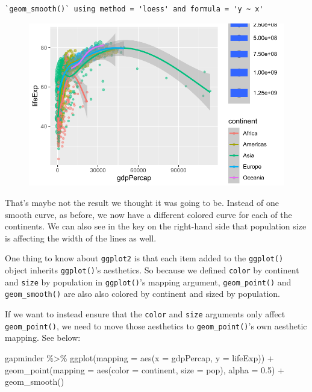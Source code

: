 \documentclass[
  letterpaper,
]{book}
\newenvironment{Shaded}{\begin{snugshade}}{\end{snugshade}}
\newcommand{\AttributeTok}[1]{\textcolor[rgb]{0.40,0.45,0.13}{#1}}
\newcommand{\FloatTok}[1]{\textcolor[rgb]{0.68,0.00,0.00}{#1}}
\newcommand{\FunctionTok}[1]{\textcolor[rgb]{0.28,0.35,0.67}{#1}}
\newcommand{\NormalTok}[1]{\textcolor[rgb]{0.00,0.23,0.31}{#1}}
\newcommand{\SpecialCharTok}[1]{\textcolor[rgb]{0.37,0.37,0.37}{#1}}
\begin{document}
\begin{verbatim}
`geom_smooth()` using method = 'loess' and formula = 'y ~ x'
\end{verbatim}

\begin{figure}[H]

{\centering \includegraphics{visualizing-with-ggplot_files/figure-pdf/unnamed-chunk-21-1.pdf}

}

\end{figure}

That's maybe not the result we thought it was going to be. Instead of
one smooth curve, as before, we now have a different colored curve for
each of the continents. We can also see in the key on the right-hand
side that population size is affecting the width of the lines as well.

One thing to know about \texttt{ggplot2} is that each item added to the
\texttt{ggplot()} object inherits \texttt{ggplot()}'s aesthetics. So
because we defined \texttt{color} by continent and \texttt{size} by
population in \texttt{ggplot()}'s mapping argument,
\texttt{geom\_point()} and \texttt{geom\_smooth()} are also also colored
by continent and sized by population.

If we want to instead ensure that the \texttt{color} and \texttt{size}
arguments only affect \texttt{geom\_point()}, we need to move those
aesthetics to \texttt{geom\_point()}'s own aesthetic mapping. See below:

\begin{Shaded}
\begin{Highlighting}[]
\NormalTok{gapminder }\SpecialCharTok{\%\textgreater{}\%}
  \FunctionTok{ggplot}\NormalTok{(}\AttributeTok{mapping =} \FunctionTok{aes}\NormalTok{(}\AttributeTok{x =}\NormalTok{ gdpPercap, }
                       \AttributeTok{y =}\NormalTok{ lifeExp)) }\SpecialCharTok{+}
  \FunctionTok{geom\_point}\NormalTok{(}\AttributeTok{mapping =} \FunctionTok{aes}\NormalTok{(}\AttributeTok{color =}\NormalTok{ continent,}
                       \AttributeTok{size =}\NormalTok{ pop),}
             \AttributeTok{alpha =} \FloatTok{0.5}\NormalTok{) }\SpecialCharTok{+}
  \FunctionTok{geom\_smooth}\NormalTok{()}
\end{Highlighting}
\end{Shaded}
\end{document}
